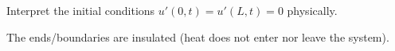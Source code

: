 Interpret the initial conditions $u'(0,t) = u'(L,t) = 0$ physically.

\soln* 

The ends/boundaries are insulated (heat does not enter nor leave the system).